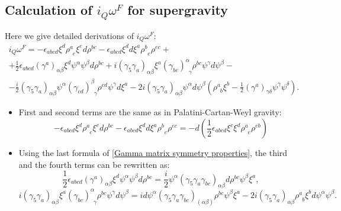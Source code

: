 \documentclass[a4paper,12pt]{article}
\numberwithin{equation}{section} %
\numberwithin{equation}{section}
\begin{document}
\begin{appendix}
    \section{Calculation of $i_Q \omega^F$ for supergravity}
    \label{app:iq=dH}
    Here we give detailed derivations of $i_Q \omega^F$: 
    \begin{equation}
    \begin{gathered}
        i_Q \omega^F = -\epsilon_{abcd}\xi^d \rho^a_{\enspace e} \xi^e d\rho^{bc}- \epsilon_{abcd}\xi^d d\xi^a \rho^b_{\enspace e} \rho^{ec} + \\
        + \frac{1}{2} \epsilon_{abcd} (\gamma^a)_{\alpha\beta} \xi^d \psi^\alpha \psi^\beta d \rho^{bc}  +i (\gamma_5\gamma_a)_{\alpha\beta}\xi^a (\gamma_{bc})^\alpha_{\enspace \gamma} \rho^{bc}\psi^\gamma d\psi^\beta  - \\
        -  \frac{i}{2}(\gamma_5\gamma_a)_{\alpha\beta} \psi^\alpha (\gamma_{cd})^\beta_{\enspace\gamma} \rho^{cd} \psi^\gamma d\xi^a - 2i (\gamma_5\gamma_a)_{\alpha\beta} \psi^\alpha d\psi^\beta (\rho_{\enspace b}^a \xi^b - \frac{1}{2} (\gamma^a)_{\gamma\delta} \psi^\gamma \psi^\delta).
    \end{gathered}
    \end{equation}
    \begin{itemize}
        \item First and second terms are the same as in Palatini-Cartan-Weyl gravity:
        \begin{equation}
           -\epsilon_{abcd}\xi^d \rho^a_{\enspace e} \xi^e d\rho^{bc}- \epsilon_{abcd}\xi^d d\xi^a \rho^b_{\enspace e} \rho^{ec} = -d\left(\frac{1}{2}\epsilon_{abcd}\xi^c \xi^d \rho^a_{\enspace e} \rho^{eb}\right)
        \end{equation}
        \item Using the last formula of \eqref{Gamma matrix symmetry properties}, the third and the fourth terms can be rewritten as:
        \begin{equation}
            \frac{1}{2} \epsilon_{abcd}(\gamma^a)_{\alpha\beta}\xi^d \psi^\alpha \psi^\beta d \rho^{bc} = \frac{i}{2}\psi^\alpha(\gamma_5 \gamma_a \gamma_{bc})_{\alpha\beta}  d\rho^{bc} \psi^\beta \xi^a,
        \end{equation}
        \begin{equation} \label{4 summand}
           i (\gamma_5\gamma_a)_{\alpha\beta}\xi^a (\gamma_{bc})^\alpha_{\enspace \gamma} \rho^{bc}\psi^\gamma d\psi^\beta =  id \psi^\alpha(\gamma_5 \gamma_a \gamma_{bc})_{(\alpha\beta)} \rho^{bc} \psi^\beta \xi^a  -2i (\gamma_5\gamma_a)_{\alpha\beta} \rho^a_{\enspace b}\xi^b d\psi^\alpha \psi^\beta.

\end{equation}
\end{itemize}
\end{appendix}
\end{document}
